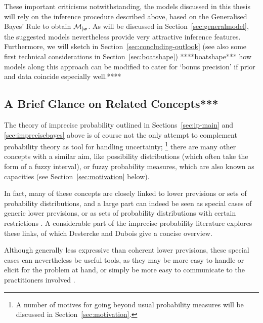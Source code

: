 These important criticisms notwithstanding, 
the models discussed in this thesis will rely on the inference procedure described above,
based on the Generalised Bayes' Rule to obtain $\mathcal{M}_{|{\bm x}}$.
As will be discussed in Section~\ref{sec:generalmodel},
the suggested models nevertheless provide very attractive inference features.
Furthermore, we will sketch in Section~\ref{sec:concluding-outlook}
(see also some first technical considerations in Section~\ref{sec:boatshape}) ****boatshape***
how models along this approach can be modified to cater for `bonus precision'
if prior and data coincide especially well.****


\subsection{A Brief Glance on Related Concepts***}
\label{sec:ip-related}


The theory of imprecise probability outlined in Sections~\ref{sec:ip-main} and \ref{sec:imprecisebayes} above
is of course not the only attempt to complement probability theory as tool for handling uncertainty;%
\footnote{A number of motives for going beyond usual probability measures will be discussed in Section~\ref{sec:motivation}.}
there are many other concepts with a similar aim,
like possibility distributions (which often take the form of a fuzzy interval),
or fuzzy probability measures, which are also known as capacities (see Section~\ref{sec:motivation} below).

In fact, many of these concepts are closely linked to
lower previsions or sets of probability distributions,
and a large part can indeed be seen as special cases of generic lower previsions, 
or as sets of probability distributions with certain restrictions
\parencite[Fig.~5.5]{itip-special}.
A considerable part of the imprecise probability literature
explores these links, of which Destercke and Dubois \parencite*{itip-other,itip-special}
give a concise overview.


Although generally less expressive than coherent lower previsions,
these special cases can nevertheless be useful tools,
as they may be more easy to handle or elicit for the problem at hand,
or simply be more easy to communicate to the practitioners involved
\parencite[\S 1]{itip-special}.

